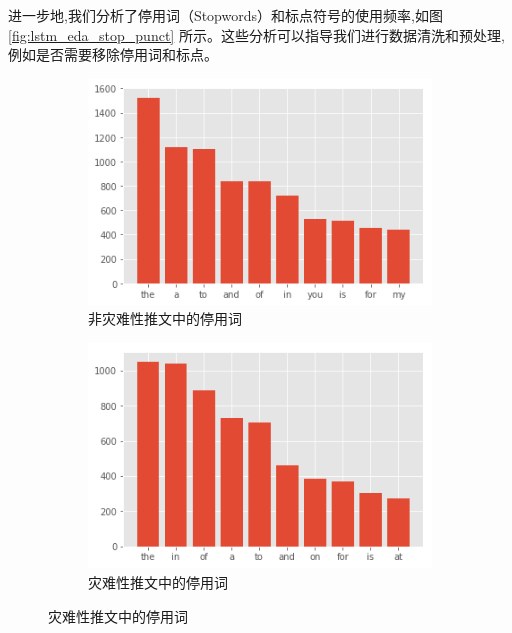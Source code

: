 进一步地,我们分析了停用词（Stopwords）和标点符号的使用频率,如图 \ref{fig:lstm_eda_stop_punct} 所示。这些分析可以指导我们进行数据清洗和预处理,例如是否需要移除停用词和标点。
\begin{figure}[H]
    \centering
    \begin{subfigure}[b]{0.48\textwidth}
        \centering
        \includegraphics[width=\textwidth]{figures/LSTM5.png}
        \caption{非灾难性推文中的停用词}
        \label{fig:stopword_non_disaster}
    \end{subfigure}
    \hfill
    \begin{subfigure}[b]{0.48\textwidth}
        \centering
        \includegraphics[width=\textwidth]{figures/LSTM6.png}
        \caption{灾难性推文中的停用词}
        \label{fig:stopword_disaster}
    \end{subfigure}
    
    \vspace{1cm}
    

\end{figure}
